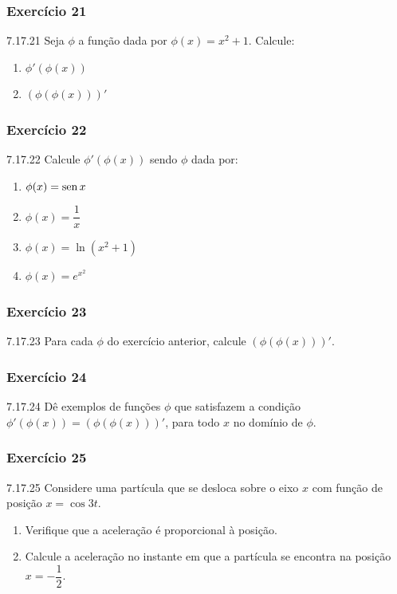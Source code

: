 \subsubsection*{Exercício 21}
\begin{exercicio}[21]{7.17.21}
Seja $\phi$ a função dada por $\phi(x) = x^2 + 1$. Calcule:
\begin{enumerate}[label=\alph*)]
    \item $\phi'(\phi(x))$
    \item $(\phi(\phi(x)))'$
\end{enumerate}
\end{exercicio}

\subsubsection*{Exercício 22}
\begin{exercicio}[22]{7.17.22}
Calcule $\phi'(\phi(x))$ sendo $\phi$ dada por:
\begin{enumerate}[label=\alph*)]
    \item $\phi(x) = \operatorname{sen} x$
    \item $\phi(x) = \dfrac{1}{x}$
    \item $\phi(x) = \ln(x^2 + 1)$
    \item $\phi(x) = e^{x^2}$
\end{enumerate}
\end{exercicio}

\subsubsection*{Exercício 23}
\begin{exercicio}[23]{7.17.23}
Para cada $\phi$ do exercício anterior, calcule $(\phi(\phi(x)))'$.
\end{exercicio}

\subsubsection*{Exercício 24}
\begin{exercicio}[24]{7.17.24}
Dê exemplos de funções $\phi$ que satisfazem a condição $\phi'(\phi(x)) = (\phi(\phi(x)))'$, para todo $x$ no domínio de $\phi$.
\end{exercicio}

\subsubsection*{Exercício 25}
\begin{exercicio}[25]{7.17.25}
Considere uma partícula que se desloca sobre o eixo $x$ com função de posição $x = \cos 3t$.
\begin{enumerate}[label=\alph*)]
    \item Verifique que a aceleração é proporcional à posição.
    \item Calcule a aceleração no instante em que a partícula se encontra na posição $x = -\dfrac{1}{2}$.
\end{enumerate}
\end{exercicio}

